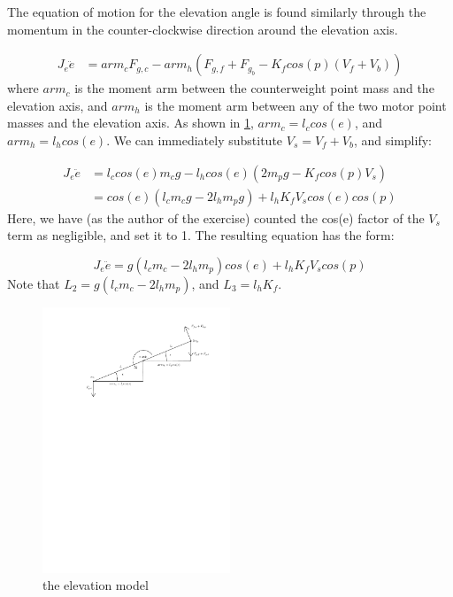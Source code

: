 The equation of motion for the elevation angle is found similarly
through the momentum in the counter-clockwise direction around the
elevation axis.

\begin{align*}
  J_e\ddot{e} &= arm_cF_{g,c} - arm_h(F_{g,f}+F_{g_b} - K_fcos(p)(V_f + V_b))
\end{align*}
where $arm_c$ is the moment arm between the counterweight point mass
and the elevation axis, and $arm_h$ is the moment arm between any of
the two motor point masses and the elevation axis. As shown in
\cref{fig:elevation_model}, $arm_c = l_ccos(e)$, and $arm_h =
l_hcos(e)$.  We can
immediately substitute $V_s = V_f + V_b$, and simplify:

\begin{align*}
  J_e\ddot{e} &= l_ccos(e)m_cg - l_hcos(e)(2m_pg - K_fcos(p)V_s) \\
              &= cos(e)(l_cm_cg - 2l_hm_pg) + l_hK_fV_scos(e)cos(p)
\end{align*}
Here, we have (as the author of the exercise) counted the cos(e)
factor of the $V_s$ term as negligible, and set it to 1.  The resulting equation has the form:

\begin{equation}
\label{eq:elevation EoM}
  J_e\ddot{e} = g(l_cm_c - 2l_hm_p)cos(e) + l_hK_fV_scos(p)
\end{equation}
Note that $L_2 = g(l_cm_c-2l_hm_p)$, and $L_3 = l_hK_f$.

\begin{figure}[H]
  \caption{the elevation model}
  \label{fig:elevation_model}
  \includegraphics[width=0.5\textwidth]{images/elevation_model}
\end{figure}

